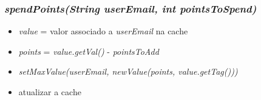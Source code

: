 \documentclass[a4paper]{article}
\begin{document}
\subsubsection{\textit{spendPoints(String userEmail, int pointsToSpend)}}
\begin{itemize}
\item \textit{value} = valor associado a \textit{userEmail} na cache
\item \textit{points} = \textit{value.getVal()} - \textit{pointsToAdd}
\item \textit{setMaxValue(userEmail, newValue(points, value.getTag()))}
\item atualizar a cache
\end{itemize}
\end{document}
